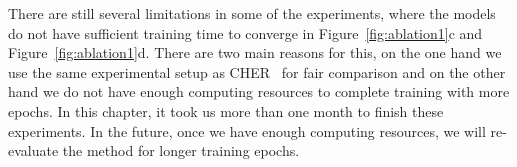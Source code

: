 There are still several limitations in some of the experiments, where the models do not have sufficient training time to converge in Figure~\ref{fig:ablation1}c and Figure~\ref{fig:ablation1}d. There are two main reasons for this, on the one hand we use the same experimental setup as CHER~\cite{fang2019curriculum} for fair comparison and on the other hand we do not have enough computing resources to complete training with more epochs. In this chapter, it took us more than one month to finish these experiments. In the future, once we have enough computing resources, we will re-evaluate the method for longer training epochs.
